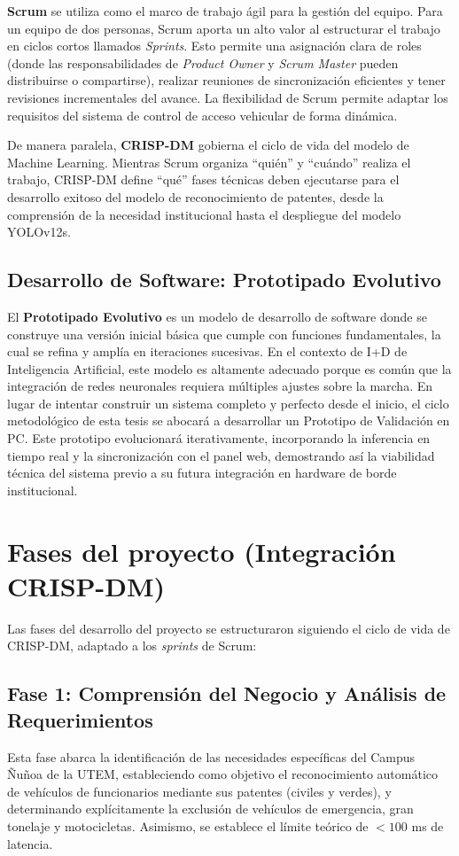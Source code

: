 \textbf{Scrum} se utiliza como el marco de trabajo ágil para la gestión del equipo. Para un equipo de dos personas, Scrum aporta un alto valor al estructurar el trabajo en ciclos cortos llamados \textit{Sprints}. Esto permite una asignación clara de roles (donde las responsabilidades de \textit{Product Owner} y \textit{Scrum Master} pueden distribuirse o compartirse), realizar reuniones de sincronización eficientes y tener revisiones incrementales del avance. La flexibilidad de Scrum permite adaptar los requisitos del sistema de control de acceso vehicular de forma dinámica.

De manera paralela, \textbf{CRISP-DM} gobierna el ciclo de vida del modelo de Machine Learning. Mientras Scrum organiza ``quién'' y ``cuándo'' realiza el trabajo, CRISP-DM define ``qué'' fases técnicas deben ejecutarse para el desarrollo exitoso del modelo de reconocimiento de patentes, desde la comprensión de la necesidad institucional hasta el despliegue del modelo YOLOv12s.

\subsection{Desarrollo de Software: Prototipado Evolutivo}

El \textbf{Prototipado Evolutivo} es un modelo de desarrollo de software donde se construye una versión inicial básica que cumple con funciones fundamentales, la cual se refina y amplía en iteraciones sucesivas. En el contexto de I+D de Inteligencia Artificial, este modelo es altamente adecuado porque es común que la integración de redes neuronales requiera múltiples ajustes sobre la marcha. En lugar de intentar construir un sistema completo y perfecto desde el inicio, el ciclo metodológico de esta tesis se abocará a desarrollar un Prototipo de Validación en PC. Este prototipo evolucionará iterativamente, incorporando la inferencia en tiempo real y la sincronización con el panel web, demostrando así la viabilidad técnica del sistema previo a su futura integración en hardware de borde institucional.

\section{Fases del proyecto (Integración CRISP-DM)}

Las fases del desarrollo del proyecto se estructuraron siguiendo el ciclo de vida de CRISP-DM, adaptado a los \textit{sprints} de Scrum:

\subsection{Fase 1: Comprensión del Negocio y Análisis de Requerimientos}
Esta fase abarca la identificación de las necesidades específicas del Campus Ñuñoa de la UTEM, estableciendo como objetivo el reconocimiento automático de vehículos de funcionarios mediante sus patentes (civiles y verdes), y determinando explícitamente la exclusión de vehículos de emergencia, gran tonelaje y motocicletas. Asimismo, se establece el límite teórico de $<100$ ms de latencia.

